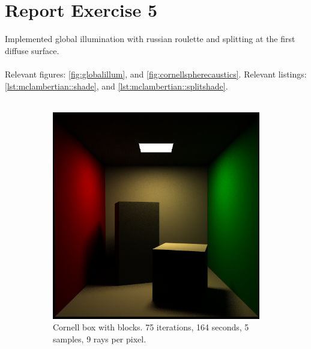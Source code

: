 \section{Report Exercise 5}

Implemented global illumination with russian roulette and splitting at the first diffuse surface.\\
\\
Relevant figures: \ref{fig:globalillum}, and \ref{fig:cornellspherecaustics}. Relevant listings: \ref{lst:mclambertian::shade}, and \ref{lst:mclambertian::splitshade}.\\
\\
\begin{figure}[h]
	\centering
	\begin{subfigure}[b]{0.7\textwidth}
		\includegraphics[width=\textwidth]{week5/cornellblocks_75_164s_5spp_9rpp_split.png}
		\caption{Cornell box with blocks. 75 iterations, 164 seconds, 5 samples, 9 rays per pixel.}
		\label{fig:cornellblocksglobalillum}
	\end{subfigure}
	\begin{subfigure}[b]{0.7\textwidth}

\end{subfigure}
\end{figure}
